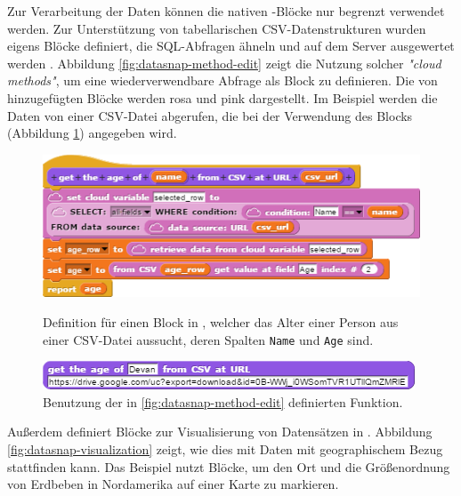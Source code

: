 Zur Verarbeitung der Daten können die nativen \Snap{}-Blöcke nur begrenzt verwendet werden. Zur Unterstützung von tabellarischen CSV-Datenstrukturen wurden eigens Blöcke definiert, die \acs{SQL}-Abfragen ähneln und auf dem Server ausgewertet werden \parencite{hellmannDataSnapEnabling2015}. Abbildung \ref{fig:datasnap-method-edit} zeigt die Nutzung solcher \textit{"cloud methods"}, um eine wiederverwendbare Abfrage als Block zu definieren. Die von \DataSnap{} hinzugefügten Blöcke werden rosa und pink dargestellt. Im Beispiel werden die Daten von einer \acs{CSV}-Datei abgerufen, die bei der Verwendung des Blocks (Abbildung \ref{fig:datasnap-method-use}) angegeben wird.

\begin{figure}[!ht]
  \begin{minipage}[t]{.54\textwidth}
    \includegraphics[width=\linewidth]{assets/datasnap-method-edit.png}
    \caption{Definition für einen Block in \DataSnap{}, welcher das Alter einer Person aus einer \acs{CSV}-Datei aussucht, deren Spalten \texttt{Name} und \texttt{Age} sind.}
    \label{fig:datasnap-method-edit}
  \end{minipage}
  \hfill
  \begin{minipage}[t]{.44\textwidth}
    \includegraphics[width=\linewidth]{assets/datasnap-method-use.png}
    \caption{Benutzung der in \ref{fig:datasnap-method-edit} definierten Funktion.}
    \label{fig:datasnap-method-use}
  \end{minipage}
\end{figure}

Außerdem definiert \DataSnap{} Blöcke zur Visualisierung von Datensätzen in \Snap{} \parencite{hellmannDataSnapEnabling2015}. Abbildung \ref{fig:datasnap-visualization} zeigt, wie dies mit Daten mit geographischem Bezug stattfinden kann. Das Beispiel nutzt Blöcke, um den Ort und die Größenordnung von Erdbeben in Nordamerika auf einer Karte zu markieren.

